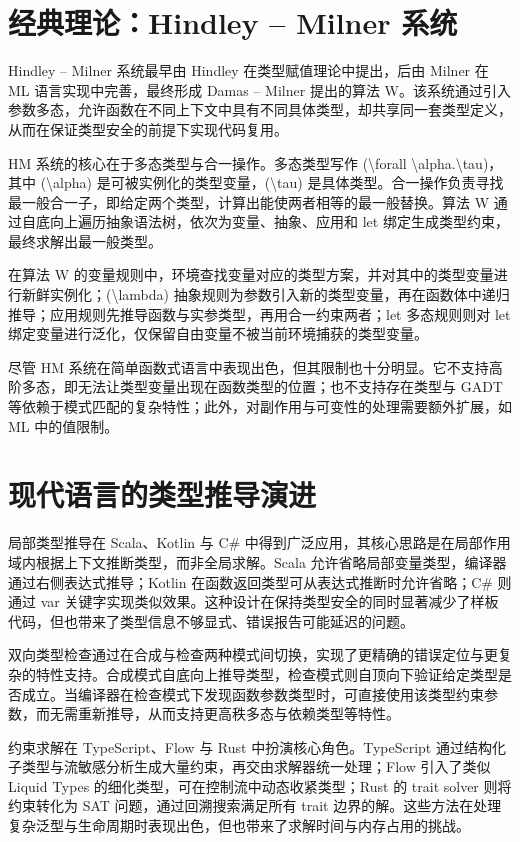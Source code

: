 \chapter{经典理论：Hindley – Milner 系统}
Hindley – Milner 系统最早由 Hindley 在类型赋值理论中提出，后由 Milner 在 ML 语言实现中完善，最终形成 Damas – Milner 提出的算法 W。该系统通过引入参数多态，允许函数在不同上下文中具有不同具体类型，却共享同一套类型定义，从而在保证类型安全的前提下实现代码复用。\par
HM 系统的核心在于多态类型与合一操作。多态类型写作 (\textbackslash{}forall \textbackslash{}alpha.\textbackslash{}tau)，其中 (\textbackslash{}alpha) 是可被实例化的类型变量，(\textbackslash{}tau) 是具体类型。合一操作负责寻找最一般合一子，即给定两个类型，计算出能使两者相等的最一般替换。算法 W 通过自底向上遍历抽象语法树，依次为变量、抽象、应用和 let 绑定生成类型约束，最终求解出最一般类型。\par
在算法 W 的变量规则中，环境查找变量对应的类型方案，并对其中的类型变量进行新鲜实例化；(\textbackslash{}lambda) 抽象规则为参数引入新的类型变量，再在函数体中递归推导；应用规则先推导函数与实参类型，再用合一约束两者；let 多态规则则对 let 绑定变量进行泛化，仅保留自由变量不被当前环境捕获的类型变量。\par
尽管 HM 系统在简单函数式语言中表现出色，但其限制也十分明显。它不支持高阶多态，即无法让类型变量出现在函数类型的位置；也不支持存在类型与 GADT 等依赖于模式匹配的复杂特性；此外，对副作用与可变性的处理需要额外扩展，如 ML 中的值限制。\par
\chapter{现代语言的类型推导演进}
局部类型推导在 Scala、Kotlin 与 C\#{} 中得到广泛应用，其核心思路是在局部作用域内根据上下文推断类型，而非全局求解。Scala 允许省略局部变量类型，编译器通过右侧表达式推导；Kotlin 在函数返回类型可从表达式推断时允许省略；C\#{} 则通过 var 关键字实现类似效果。这种设计在保持类型安全的同时显著减少了样板代码，但也带来了类型信息不够显式、错误报告可能延迟的问题。\par
双向类型检查通过在合成与检查两种模式间切换，实现了更精确的错误定位与更复杂的特性支持。合成模式自底向上推导类型，检查模式则自顶向下验证给定类型是否成立。当编译器在检查模式下发现函数参数类型时，可直接使用该类型约束参数，而无需重新推导，从而支持更高秩多态与依赖类型等特性。\par
约束求解在 TypeScript、Flow 与 Rust 中扮演核心角色。TypeScript 通过结构化子类型与流敏感分析生成大量约束，再交由求解器统一处理；Flow 引入了类似 Liquid Types 的细化类型，可在控制流中动态收紧类型；Rust 的 trait solver 则将约束转化为 SAT 问题，通过回溯搜索满足所有 trait 边界的解。这些方法在处理复杂泛型与生命周期时表现出色，但也带来了求解时间与内存占用的挑战。\par
